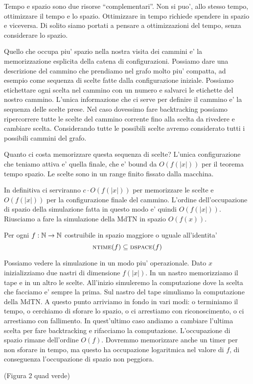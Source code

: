 Tempo e spazio sono due risorse ``complementari''. Non si puo', allo stesso tempo, ottimizzare il
tempo e lo spazio. Ottimizzare in tempo richiede spendere in spazio e viceversa.  Di solito siamo
portati a pensare a ottimizzazioni del tempo, senza considerare lo spazio.

Quello che occupa piu' spazio nella nostra visita dei cammini e' la memorizzazione esplicita della
catena di configurazioni. Possiamo dare una descrizione del cammino che prendiamo nel grafo molto
piu' compatta, ad esempio come sequenza di scelte fatte dalla configurazione iniziale. Possiamo
etichettare ogni scelta nel cammino con un numero e salvarci le etichette del nostro cammino.
L'unica informazione che ci serve per definire il cammino e' la sequenza delle scelte prese. Nel
caso dovessimo fare backtracking possiamo ripercorrere tutte le scelte del cammino corrente fino
alla scelta da rivedere e cambiare scelta. Considerando tutte le possibili scelte avremo considerato
tutti i possibili cammini del grafo.

Quanto ci costa memorizzare questa sequenza di scelte? L'unica configurazione che teniamo attiva e'
quella finale, che e' bound da $O(f(|x|))$ per il teorema tempo spazio. Le scelte sono in un range
finito fissato dalla macchina.

In definitiva ci serviranno $c\cdot O(f(|x|))$ per memorizzare le scelte e $O(f(|x|))$ per la
configurazione finale del cammino. L'ordine dell'occupazione di spazio della simulazione fatta in
questo modo e' quindi $O(f(|x|))$. Riusciamo a fare la simulazione della MdTN in spazio $O(f(x))$.

\begin{thm}
    Per ogni $f:\mathbb{N} \to \mathbb{N}$ costruibile in spazio maggiore o uguale all'identita'
    \begin{equation*}
        \textsc{ntime}(f) \subseteq \textsc{dspace}(f)
    \end{equation*}
\end{thm}

Possiamo vedere la simulazione in un modo piu' operazionale. Dato $x$ inizializziamo due nastri di
dimensione $f(|x|)$. In un nastro memorizziamo il tape e in un altro le scelte. All'inizio
simuleremo la computazione dove la scelta che facciamo e' sempre la prima. Sul nastro del tape
simuliamo la computazione della MdTN. A questo punto arriviamo in fondo in vari modi: o terminiamo
il tempo, o cerchiamo di sforare lo spazio, o ci arrestiamo con riconoscimento, o ci arrestiamo con
fallimento. In quest'ultimo caso andiamo a cambiare l'ultima scelta per fare backtracking e
rifacciamo la computazione. L'occupazione di spazio rimane dell'ordine $O(f)$. Dovremmo memorizzare
anche un timer per non sforare in tempo, ma questo ha occupazione logaritmica nel valore di $f$, di
conseguenza l'occupazione di spazio non peggiora.

(Figura 2 quad verde)
